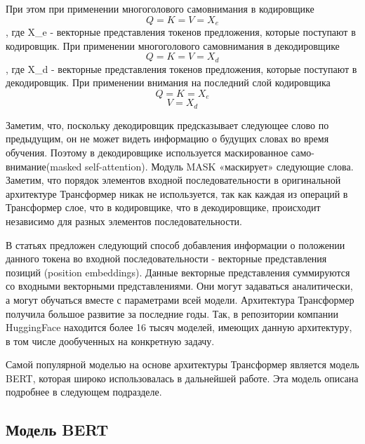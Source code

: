 При этом при применении многоголового самовнимания в кодировщике
\begin{equation}
  Q = K = V = X_e
\end{equation},
где X\_e - векторные представления токенов предложения, которые поступают в кодировщик.
При применении многоголового самовнимания в декодировщике
\begin{equation}
  Q = K = V = X_d
\end{equation},
где X\_d - векторные представления токенов предложения, которые поступают в декодировщик.
При применении внимания на последний слой кодировщика
\begin{equation}
  Q = K = X_e
\end{equation}
\begin{equation}
  V = X_d
\end{equation}

 Заметим, что, поскольку декодировщик предсказывает следующее слово по предыдущим, он не может видеть информацию о будущих словах во время обучения. Поэтому в декодировщике используется маскированное само-внимание(masked self-attention). Модуль MASK «маскирует» следующие слова.
Заметим, что порядок элементов входной последовательности в оригинальной архитектуре Трансформер никак не используется, так как каждая из операций в Трансформер слое, что в кодировщике, что в декодировщике, происходит независимо для разных элементов последовательности. 

В статьях \cite{devlin_2018,gehring_2017,vaswani_2017} предложен следующий способ добавления информации о положении данного токена во входной последовательности - векторные представления позиций (position embeddings). Данные векторные представления суммируются со входными векторными представлениями. Они могут задаваться аналитически, а могут обучаться вместе с параметрами всей модели.
Архитектура Трансформер получила большое развитие за последние годы. Так, в репозитории компании HuggingFace \cite{na_website_ndaa} находится более 16 тысяч моделей, имеющих данную архитектуру, в том числе дообученных на конкретную задачу. 

Самой популярной моделью на основе архитектуры Трансформер является модель BERT, которая широко использовалась в дальнейшей работе. Эта модель описана подробнее в следующем подразделе. 

\subsection{Модель BERT}

